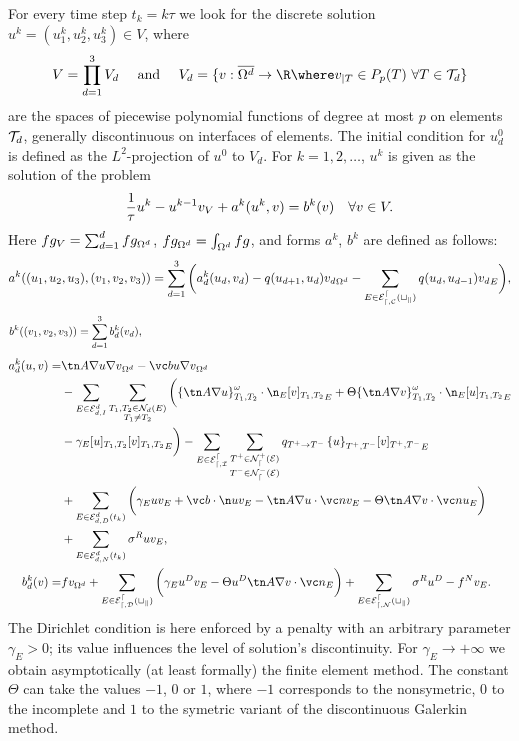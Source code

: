 For every time step $t_k=k\tau$ we look for the discrete solution $u^{k}=(u_1^{k},u_2^{k},u_3^{k})\in V$, where
$$ V=\prod_{d=1}^3 V_d \quad\mbox{ and }\quad V_d = \{v:\overline{\Omega^d}\to\R\where v_{|T}\in P_p(T)~\forall T\in\Td\} $$
are the spaces of piecewise polynomial functions of degree at most $p$ on elements $\mathcal T_d$,
 generally discontinuous on interfaces of elements.
The initial condition for $u_d^{0}$ is defined as the $L^2$-projection of $u^0$ to $V_d$.
For $k=1,2,\ldots$, $u^{k}$ is given as the solution of the problem
\begin{equation*}
 \frac1\tau\sc{u^{k}-u^{k-1}}{v}_{V} + a^{k}(u^{k},v) = b^{k}(v) \quad \forall v\in V.
\end{equation*}
Here $\sc{f}{g}_{V}=\sum_{d=1}^d\sc{f}{g}_{\Omega^d}$, $\sc{f}{g}_{\Omega^d}=\int_{\Omega^d} f g$,
 and forms $a^{k}$, $b^{k}$
 are defined as follows:
\[
  a^{k}((u_1,u_2,u_3),(v_1,v_2,v_3))
   = \sum_{d=1}^3\bigg( a^{k}_d(u_d,v_d)
    - \sc{q(u_{d+1},u_d)}{v_d}_{\Omega^d}
    - \sum_{E\in\mathcal E_{d,C}^d(t_k)}\sc{q(u_d,u_{d-1})}{v_d}_E \bigg),
\]
\[ b^{k}((v_1,v_2,v_3)) = \sum_{d=1}^3 b^{k}_d(v_d), \mbox{\hspace{11.7cm}} \]
\begin{align*}
 a^{k}_d(u,v) = &\sc{\tn A\nabla u}{\nabla v}_{\Omega^d}
 - \sc{\vc b u}{\nabla v}_{\Omega^d}\\
 &- \sum_{E\in\Ehint^d}\sum_{\substack{T_1,T_2\in\Ngh(E)\\T_1\neq T_2}}\bigg(\sc{\wavg{\tn A\nabla u}{T_1}{T_2}\cdot\n_E}{\jmp{v}_{T_1,T_2}}_E + \Theta\sc{\wavg{\tn A\nabla v}{T_1}{T_2}\cdot\n_E}{\jmp{u}_{T_1,T_2}}_E \\
 &- \gamma_E\sc{\jmp{u}_{T_1,T_2}}{\jmp{v}_{T_1,T_2}}_E \bigg)
 - \sum_{E\in\Ehint^d}\sum_{\substack{T^+\in\Ngh^+(E)\\T^-\in\Ngh^-(E)}}\sc{q_{T^+\to T^-}\avg{u}_{T^+,T^-}}{\jmp{v}_{T^+,T^-}}_E\\
 &+ \sum_{E\in\Ehdir^d(t_k)}\bigg(\gamma_E\sc{u}{v}_E + \sc{\vc b\cdot\n u}{v}_E - \sc{\tn A\nabla u\cdot\vc n}{v}_E - \Theta\sc{\tn A\nabla v\cdot\vc n}{u}_E\bigg)\\
 &+ \sum_{E\in\Ehneu^d(t_k)}\sc{\sigma^R u}{v}_E,\\
% 
 b^{k}_d(v) = &\sc{f}{v}_{\Omega^d} + \sum_{E\in\Ehdir^d(t_k)}\bigg(\gamma_E\sc{u^D}{v}_E - \Theta\sc{u^D}{\tn A\nabla v\cdot\vc n}_E\bigg)
 + \sum_{E\in\Ehneu^d(t_k)}\sc{\sigma^R u^D-f^N}{v}_E.
\end{align*}
The Dirichlet condition is here enforced by a penalty with an arbitrary parameter $\gamma_E>0$;
 its value influences the level of solution's discontinuity.
For $\gamma_E\to+\infty$ we obtain asymptotically (at least formally) the finite element method.
The constant $\Theta$ can take the values $-1$, $0$ or $1$,
 where $-1$ corresponds to the nonsymetric, $0$ to the incomplete and $1$ to the symetric variant of the discontinuous Galerkin method.




